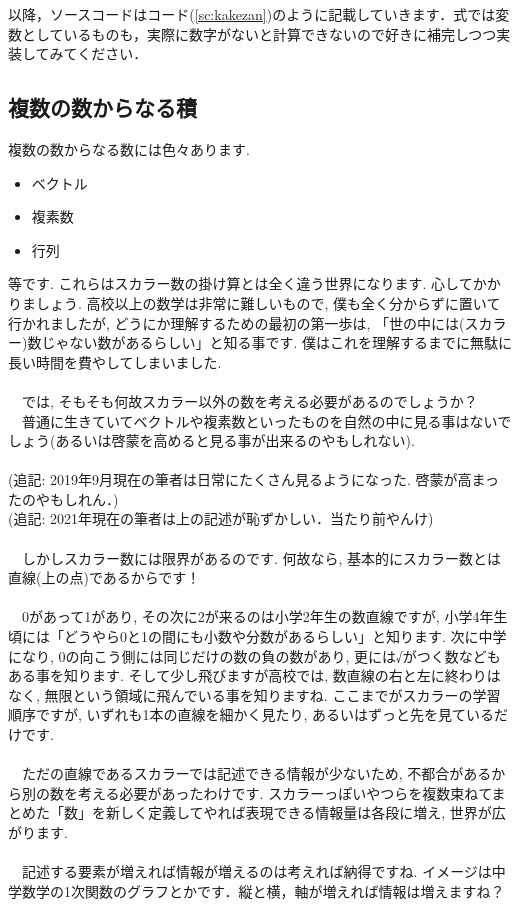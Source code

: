 \documentclass[11pt,a4paper]{jreport}
\begin{document}
以降，ソースコードはコード(\ref{sc:kakezan})のように記載していきます．式では変数としているものも，実際に数字がないと計算できないので好きに補完しつつ実装してみてください．
\subsection{複数の数からなる積}
複数の数からなる数には色々あります.\\
\begin{itemize}
 \item ベクトル
 \item 複素数
 \item 行列
\end{itemize}

等です. これらはスカラー数の掛け算とは全く違う世界になります. 心してかかりましょう. 高校以上の数学は非常に難しいもので, 僕も全く分からずに置いて行かれましたが, どうにか理解するための最初の第一歩は, 「世の中には(スカラー)数じゃない数があるらしい」と知る事です. 僕はこれを理解するまでに無駄に長い時間を費やしてしまいました. \\
\\
　では, そもそも何故スカラー以外の数を考える必要があるのでしょうか？\\
　普通に生きていてベクトルや複素数といったものを自然の中に見る事はないでしょう(あるいは啓蒙を高めると見る事が出来るのやもしれない).\\
\\
(追記: 2019年9月現在の筆者は日常にたくさん見るようになった. 啓蒙が高まったのやもしれん．)\\
(追記: 2021年現在の筆者は上の記述が恥ずかしい．当たり前やんけ)\\
\\
　しかしスカラー数には限界があるのです. 何故なら, 基本的にスカラー数とは直線(上の点)であるからです！ \\
\\
　0があって1があり, その次に2が来るのは小学2年生の数直線ですが, 小学4年生頃には「どうやら0と1の間にも小数や分数があるらしい」と知ります. 次に中学になり, 0の向こう側には同じだけの数の負の数があり, 更には√がつく数などもある事を知ります. そして少し飛びますが高校では, 数直線の右と左に終わりはなく, 無限という領域に飛んでいる事を知りますね. ここまでがスカラーの学習順序ですが, いずれも1本の直線を細かく見たり, あるいはずっと先を見ているだけです. \\
\\
　ただの直線であるスカラーでは記述できる情報が少ないため, 不都合があるから別の数を考える必要があったわけです. スカラーっぽいやつらを複数束ねてまとめた「数」を新しく定義してやれば表現できる情報量は各段に増え, 世界が広がります. \\
\\
　記述する要素が増えれば情報が増えるのは考えれば納得ですね. イメージは中学数学の1次関数のグラフとかです．縦と横，軸が増えれば情報は増えますね？
\\
\end{document}

